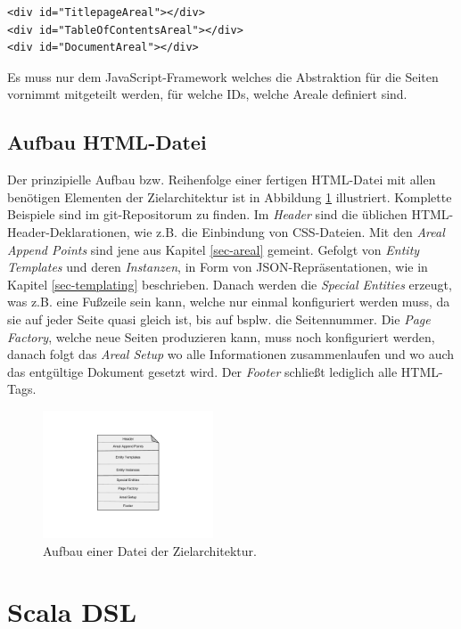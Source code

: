 \begin{verbatim}
<div id="TitlepageAreal"></div>
<div id="TableOfContentsAreal"></div>
<div id="DocumentAreal"></div>
\end{verbatim}

Es muss nur dem JavaScript-Framework welches die Abstraktion für die
Seiten vornimmt mitgeteilt werden, für welche IDs, welche Areale definiert
sind.

\subsection{Aufbau HTML-Datei}\label{sec-html-datei}

Der prinzipielle Aufbau bzw. Reihenfolge einer fertigen HTML-Datei
mit allen benötigen Elementen der Zielarchitektur ist in Abbildung
\ref{fig-zielarchitektur_aufbau} illustriert. Komplette Beispiele
sind im git-Repositorum zu finden. Im \emph{Header} sind die üblichen
HTML-Header-Deklarationen, wie z.B. die Einbindung von CSS-Dateien. Mit den
\emph{Areal Append Points} sind jene aus Kapitel \ref{sec-areal}
gemeint. Gefolgt von \emph{Entity Templates} und deren \emph{Instanzen},
in Form von JSON-Repräsentationen, wie in Kapitel \ref{sec-templating}
beschrieben. Danach werden die \emph{Special Entities} erzeugt, was z.B.
eine Fußzeile sein kann, welche nur einmal konfiguriert werden muss,
da sie auf jeder Seite quasi gleich ist, bis auf bsplw. die Seitennummer.
Die \emph{Page Factory}, welche neue Seiten produzieren kann, muss noch
konfiguriert werden, danach folgt das \emph{Areal Setup} wo alle Informationen
zusammenlaufen und wo auch das entgültige Dokument gesetzt wird.
Der \emph{Footer} schließt lediglich alle HTML-Tags.

\begin{figure}[h!]
  \centering
    \includegraphics[width=0.45\textwidth]{figures/zielarchitektur_aufbau.pdf}
  \caption{Aufbau einer Datei der Zielarchitektur.}\label{fig-zielarchitektur_aufbau}
\end{figure}

\section{Scala DSL}\label{sec-scalaDSL}


